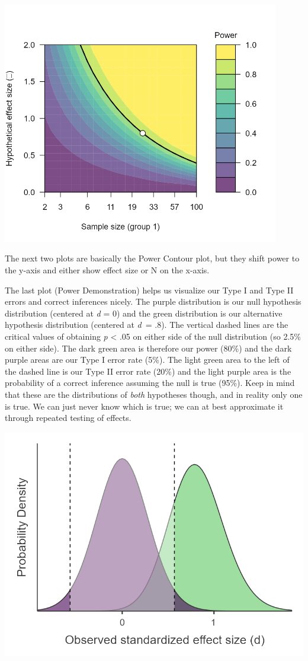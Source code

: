 \documentclass[
]{book}
\begin{document}
\includegraphics[width=4.76042in,height=\textheight]{images/05-bean/power-contour.png}

The next two plots are basically the Power Contour plot, but they shift power to the y-axis and either show effect size or N on the x-axis.

The last plot (Power Demonstration) helps us visualize our Type I and Type II errors and correct inferences nicely. The purple distribution is our null hypothesis distribution (centered at \emph{d} = 0) and the green distribution is our alternative hypothesis distribution (centered at \emph{d}~= .8). The vertical dashed lines are the critical values of obtaining \emph{p} \textless{} .05 on either side of the null distribution (so 2.5\% on either side). The dark green area is therefore our power (80\%) and the dark purple areas are our Type I error rate (5\%). The light green area to the left of the dashed line is our Type II error rate (20\%) and the light purple area is the probability of a correct inference assuming the null is true (95\%). Keep in mind that these are the distributions of \emph{both} hypotheses though, and in reality only one is true. We can just never know which is true; we can at best approximate it through repeated testing of effects.

\includegraphics[width=5.55208in,height=\textheight]{images/05-bean/power-demo.png}
\end{document}
